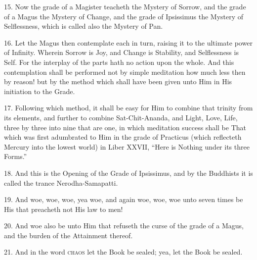 15. Now the grade of a Magister teacheth the Mystery of Sorrow, and the grade of a Magus the Mystery of Change, and the grade of Ipsissimus the Mystery of Selflessness, which is called also the Mystery of Pan.

16. Let the Magus then contemplate each in turn, raising it to the ultimate power of Infinity. Wherein Sorrow is Joy, and Change is Stability, and Selflessness is Self. For the interplay of the parts hath no action upon the whole. And this contemplation shall be performed not by simple meditation \textemdash{} how much less then by reason! but by the method which shall have been given unto Him in His initiation to the Grade.

17. Following which method, it shall be easy for Him to combine that trinity from its elements, and further to combine Sat-Chit-Ananda, and Light, Love, Life, three by three into nine that are one, in which meditation success shall be That which was first adumbrated to Him in the grade of Practicus (which reflecteth Mercury into the lowest world) in Liber XXVII, \enquote{Here is Nothing under its three Forms.}

18. And this is the Opening of the Grade of Ipsissimus, and by the Buddhists it is called the trance Nerodha-Samapatti.

19. And woe, woe, woe, yea woe, and again woe, woe, woe unto seven times be His that preacheth not His law to men!

20. And woe also be unto Him that refuseth the curse of the grade of a Magus, and the burden of the Attainment thereof.

21. And in the word \textsc{chaos} let the Book be sealed; yea, let the Book be sealed.
